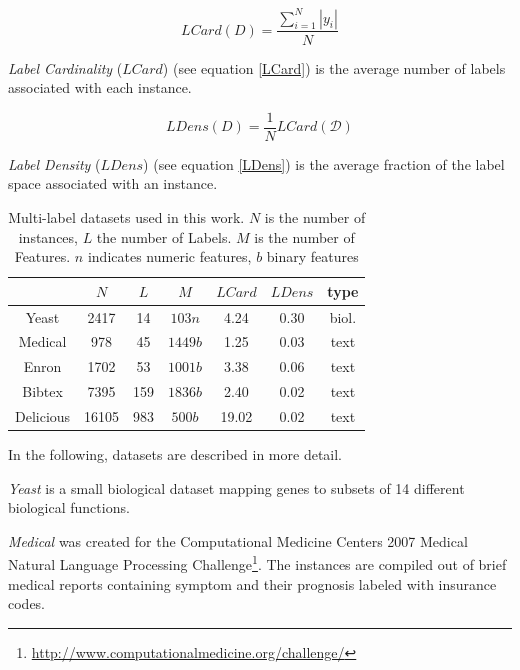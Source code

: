 		\begin{equation}
			\label{LCard}
			LCard(D)=\frac{\sum_{i=1}^N|y_i|}N
		\end{equation}
		
		\textit{Label Cardinality} ($LCard$) (see equation \ref{LCard}) is the average number of labels associated with each instance.
		
		\begin{equation}
			\label{LDens}
			LDens(D)=\frac 1N LCard(\mathcal D)
		\end{equation}
		
		\textit{Label Density} ($LDens$) (see equation \ref{LDens}) is the average fraction of the label space associated with an instance. 
		
		\begin{table}
			\begin{center}
				\begin{tabular}{ c || c | c | c | c | c | c }
					& $N$ & $L$ & $M$ & $LCard$ & $LDens$ & type \\ \hline\hline
					Yeast & 2417 & 14 & $103n$ & 4.24 & 0.30 & biol.\\ \hline
					Medical & 978 & 45 & $1449b$ & 1.25 & 0.03 & text \\ \hline
					Enron & 1702 & 53 & $1001b$ & 3.38 & 0.06 & text \\ \hline\hline
					Bibtex & 7395 & 159 & $1836b$ & 2.40 & 0.02 & text \\ \hline
					Delicious & 16105 & 983 & $500b$ & 19.02 & 0.02 & text \\
				\end{tabular}
				\caption{Multi-label datasets used in this work. $N$ is the number of instances, $L$ the number of Labels. $M$ is the number of Features. $n$ indicates numeric features, $b$ binary features}
				\label{tab:datasets}
			\end{center}
		\end{table}

		In the following, datasets are described in more detail.

		\textit{Yeast} \cite{DBLP:conf/nips/ElisseeffW01} is a small biological dataset mapping genes to subsets of 14 different biological functions.

		\textit{Medical} \cite{Pestian07w.:a} was created for the Computational Medicine Centers 2007 Medical Natural Language Processing Challenge\footnote{\url{http://www.computationalmedicine.org/challenge/}}. The instances are compiled out of brief medical reports containing symptom and their prognosis labeled with insurance codes.

